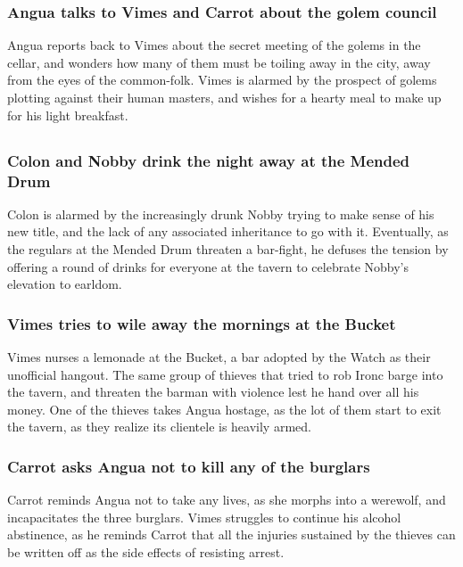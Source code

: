 \subsubsection{\Gls{Angua} talks to \Gls{Vimes} and \Gls{Carrot} about the golem council}
\Gls{Angua} reports back to \Gls{Vimes} about the secret meeting of the golems in the cellar, and
wonders how many of them must be toiling away in the city, away from the eyes of the common-folk.
\Gls{Vimes} is alarmed by the prospect of golems plotting against their human masters, and wishes
for a hearty meal to make up for his light breakfast.

\subsection{}
\subsubsection{\Gls{Colon} and \Gls{Nobby} drink the night away at the Mended Drum}
\Gls{Colon} is alarmed by the increasingly drunk \Gls{Nobby} trying to make sense of his new title,
and the lack of any associated inheritance to go with it. Eventually, as the regulars at the Mended
Drum threaten a bar-fight, he defuses the tension by offering a round of drinks for everyone at the
tavern to celebrate \Gls{Nobby}'s elevation to earldom.

\subsubsection{\Gls{Vimes} tries to wile away the mornings at the Bucket}
\Gls{Vimes} nurses a lemonade at the Bucket, a bar adopted by the Watch as their unofficial hangout.
The same group of thieves that tried to rob \Gls{Ironc} barge into the tavern, and threaten the
barman with violence lest he hand over all his money. One of the thieves takes \Gls{Angua} hostage,
as the lot of them start to exit the tavern, as they realize its clientele is heavily armed.

\subsubsection{\Gls{Carrot} asks \Gls{Angua} not to kill any of the burglars}
\Gls{Carrot} reminds \Gls{Angua} not to take any lives, as she morphs into a werewolf, and
incapacitates the three burglars. \Gls{Vimes} struggles to continue his alcohol abstinence, as he
reminds \Gls{Carrot} that all the injuries sustained by the thieves can be written off as the
side effects of resisting arrest.


